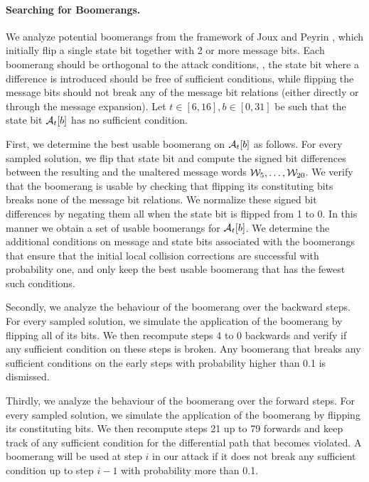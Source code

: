 \paragraph{Searching for Boomerangs.}
We analyze potential boomerangs from the framework of Joux and Peyrin \cite{DBLP:conf/crypto/JouxP07}, which initially flip a single state bit together with 2 or more message bits.
Each boomerang should be orthogonal to the attack conditions, \ie, the state bit where a difference is introduced
should be free of sufficient conditions, while flipping the message bits should not break any of the message bit relations
(either directly or through the message expansion).
Let $t\in[6,16], b\in[0,31]$ be such that the state bit $\mathcal{A}_t[b]$ has no sufficient condition.

First, we determine the best usable boomerang on $\mathcal{A}_t[b]$ as follows.
For every sampled solution, we flip that state bit and compute the signed bit differences between the resulting and the unaltered message words $\mathcal{W}_5,\ldots,\mathcal{W}_{20}$.
We verify that the boomerang is usable by checking that flipping its constituting bits breaks none of the message bit relations.
We normalize these signed bit differences by negating them all when the state bit is flipped from 1 to 0.
In this manner we obtain a set of usable boomerangs for $\mathcal{A}_t[b]$.
We determine the additional conditions on message and state bits associated with the boomerangs that ensure that the initial local collision corrections are successful with probability one,
and only keep the best usable boomerang that has the fewest such conditions.

Secondly, we analyze the behaviour of the boomerang over the backward steps.
For every sampled solution, we simulate the application of the boomerang by flipping all of its bits.
We then recompute steps 4 to 0 backwards and verify if any sufficient condition on these steps is broken.
Any boomerang that breaks any sufficient conditions on the early steps with probability higher than 0.1 is dismissed.

Thirdly, we analyze the behaviour of the boomerang over the forward steps.
For every sampled solution, we simulate the application of the boomerang by flipping its constituting bits.
We then recompute steps 21 up to 79 forwards and keep track of any sufficient condition for the differential path that becomes violated.
A boomerang will be used at step $i$ in our attack if it does not break any sufficient condition up to step $i-1$ with probability more than 0.1.

